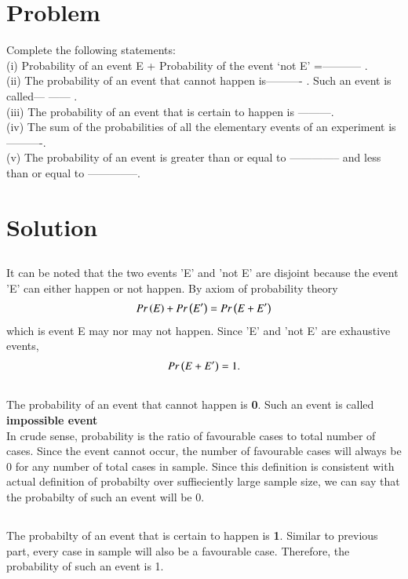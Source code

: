 \documentclass[journal,12pt,twocolumn]{IEEEtran}
\begin{document}
\section{Problem}
Complete the following statements:\\
(i) Probability of an event E + Probability of the event ‘not E’ =———– .\\
(ii) The probability of an event that cannot happen is———- . Such an event is called— —— . \\
(iii) The probability of an event that is certain to happen is ———. \\
(iv) The sum of the probabilities of all the elementary events of an experiment is———-.\\
(v) The probability of an event is greater than or equal to ————– and less than or equal to ————–.

\section{Solution}
\subsection{}
 It can be noted that the two events 'E' and 'not E' are disjoint because the event 'E' can either happen or not happen.
By axiom of probability theory 
\begin{align}
	Pr\left(E\right)+Pr\left(E'\right)=Pr\left(E+ E'\right)
\end{align} 
which is event E may nor may not happen. Since 'E' and 'not E' are exhaustive events, 
\begin{align}
	Pr\left(E+ E'\right)=1.
\end{align}
\subsection{}
The probability of an event that cannot happen is \textbf{0}. Such an event is called \textbf{impossible event}\\
In crude sense, probability is the ratio of favourable cases to total number of cases. Since the event cannot occur, the number of favourable cases will always be 0 for any number of total cases in sample. Since this definition is consistent with actual definition of probabilty over suffieciently large sample size, we can say that the probabilty of such an event will be 0.
\subsection{}
The probabilty of an event that is certain to happen is \textbf{1}.
Similar to previous part, every case in sample will also be a favourable case. Therefore, the probability of such an event is 1.
\end{document}
